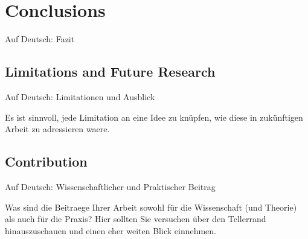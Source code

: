 \section{Conclusions}\label{sec:conclusions}

Auf Deutsch: Fazit

\subsection{Limitations and Future Research}

Auf Deutsch: Limitationen und Ausblick

Es ist sinnvoll, jede Limitation an eine Idee zu knüpfen, wie diese in zukünftigen Arbeit zu adressieren waere.

\subsection{Contribution}

Auf Deutsch: Wissenschaftlicher und Praktischer Beitrag

Was sind die Beitraege Ihrer Arbeit sowohl für die Wissenschaft (und Theorie) als auch für die Praxis? Hier sollten Sie versuchen über den Tellerrand hinauszuschauen und einen eher weiten Blick einnehmen.




